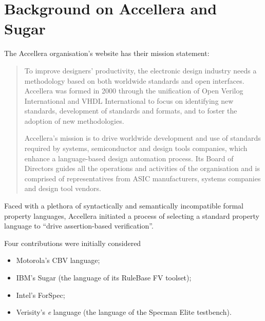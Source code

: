 \documentclass{llncs}
\begin{document}
\vspace*{-3mm}

\section{Background on Accellera and Sugar}

The Accellera organisation's website has their mission statement:

\vspace*{-1mm}

{\sl\begin{quote}

To improve designers' productivity, the electronic design industry
needs a methodology based on both worldwide standards and open
interfaces. Accellera was formed in 2000 through the unification of
Open Verilog International and VHDL International to focus on
identifying new standards, development of standards and formats, and
to foster the adoption of new methodologies.

Accellera's mission is to drive worldwide development and use of
standards required by systems, semiconductor and design tools
companies, which enhance a language-based design automation
process. Its Board of Directors guides all the operations and
activities of the organisation and is comprised of representatives
from ASIC manufacturers, systems companies and design tool vendors.
\end{quote}}

\vspace*{-1mm}

Faced with a plethora of syntactically and semantically incompatible
formal property languages, Accellera initiated a process of selecting
a standard property language to ``drive assertion-based verification''.

\newpage

Four contributions were initially considered

\vspace*{-3mm}

\begin{itemize}

\item Motorola's CBV language;

\item IBM's Sugar (the language of its RuleBase FV toolset);

\item Intel's ForSpec;

\item Verisity's {\it e} language (the language of the Specman Elite testbench).

\end{itemize}
\end{document}
